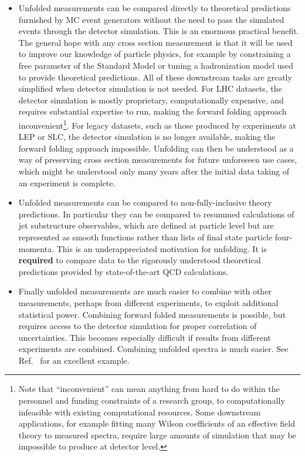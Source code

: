 \begin{itemize}
    \item Unfolded measurements can be compared directly to theoretical predictions furnished by MC event generators without the need to pass the simulated events through the detector simulation. This is an enormous practical benefit. The general hope with any cross section measurement is that it will be used to improve our knowledge of particle physics, for example by constraining a free parameter of the Standard Model or tuning a hadronization model used to provide theoretical predictions. All of these downstream tasks are greatly simplified when detector simulation is not needed. For LHC datasets, the detector simulation is mostly proprietary, computationally expensive, and requires substantial expertise to run, making the forward folding approach inconvenient\footnote{Note that ``inconvenient'' can mean anything from hard to do within the personnel and funding constraints of a research group, to computationally infeasible with existing computational resources. Some downstream applications, for example fitting many Wilson coefficients of an effective field theory to measured spectra, require large amounts of simulation that may be impossible to produce at detector level.}. For legacy datasets, such as those produced by experiments at LEP or SLC, the detector simulation is no longer available, making the forward folding approach impossible. Unfolding can then be understood as a way of preserving cross section measurements for future unforeseen use cases, which might be understood only many years after the initial data taking of an experiment is complete.
    \item Unfolded measurements can be compared to non-fully-inclusive theory predictions. In particular they can be compared to resummed calculations of jet substructure observables, which are defined at particle level but are represented as smooth functions rather than lists of final state particle four-momenta. This is an underappreciated motivation for unfolding. It is \textbf{required} to compare data to the rigorously understood theoretical predictions provided by state-of-the-art QCD calculations.
    \item Finally unfolded measurements are much easier to combine with other measurements, perhaps from different experiments, to exploit additional statistical power. Combining forward folded measurements is possible, but requires access to the detector simulation for proper correlation of uncertainties. This becomes especially difficult if results from different experiments are combined. Combining unfolded spectra is much easier. See Ref.~\cite{Heimel:2024drk} for an excellent example.
\end{itemize}

